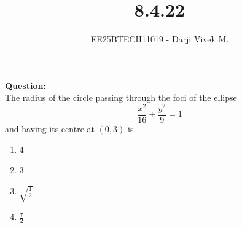 \documentclass[journal]{IEEEtran}
\begin{document}


\title{8.4.22}
\author{EE25BTECH11019 - Darji Vivek M.}
{\let\newpage\relax\maketitle}

\renewcommand{\thefigure}{\theenumi}
\renewcommand{\thetable}{\theenumi}
\setlength{\intextsep}{10pt}
\renewcommand{\thetable}{\theenumi}

\textbf{Question:}\\[2pt]
The radius of the circle passing through the foci of the ellipse
\[
\frac{x^2}{16}+\frac{y^2}{9}=1
\]
and having its centre at $(0,3)$ is -\\[6pt]
\begin{multicols}{4}
\begin{enumerate}
    \item $4$
    \item $3$
    \item $\sqrt{\frac{1}{2}}$
    \item $\frac{7}{2}$
\end{enumerate}
\end{multicols}
\end{document}
